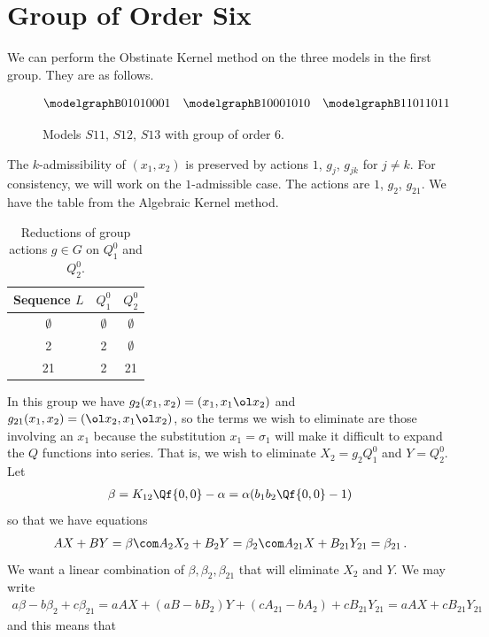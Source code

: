 \section{Group of Order Six}
We can perform the Obstinate Kernel method on the three models in the first group. They are as follows.
\begin{figure}[H]
    \centering
\[
	\modelgraphB 01010001\quad \modelgraphB 10001010 \quad \modelgraphB 11011011
\]
    \caption{Models $S11$, $S12$, $S13$ with group of order 6.}
\end{figure}
The $k$-admissibility of $(x_1,x_2)$ is preserved by actions $1$, $ g_j$, $ g_{jk}$ for $j \neq k$. For consistency, we will work on the $1$-admissible case. The actions are $1$, $ g_2$, $ g_{21}$. We have the table from the Algebraic Kernel method.
\begin{table}[H]
    \caption{Reductions of group actions $g \in G$ on $Q_1^0$ and $Q_2^0$.}
    \label{tbl:tableG6}
    \centering
    \begin{tabular}{ccc}
    \toprule
    Sequence $L$ & $Q_1^0$ & $Q_2^0$ \\  
    \midrule
      $\emptyset$ & $\emptyset$ & $\emptyset$  \\
      2 &  2& $\emptyset$ \\
      21 &  2& 21  \\
    \bottomrule
    \end{tabular}
\end{table}
In this group we have $g_2(x_1,x_2) = (x_1,x_1\ol x_2)$ and $g_{21}(x_1,x_2) = (\ol x_2,x_1\ol x_2)$, so the terms we wish to eliminate are those involving an $x_1$ because the substitution $x_1 = \sigma_1$ will make it difficult to expand the $Q$ functions into series. That is, we wish to eliminate $X_2 = g_2Q_1^0$ and $Y = Q_2^0$. Let
\begin{align}
	\beta = K_{12}\Qf{0,0} - \alpha = \alpha(b_1b_2\Qf{0,0}-1)
\end{align}
so that we have equations
\begin{align}
	AX+BY = \beta\com A_2X_2+B_2Y = \beta_2\com A_{21}X+B_{21}Y_{21} = \beta_{21}\,.		
\end{align}
We want a linear combination of $\beta, \beta_2, \beta_{21}$ that will eliminate $X_2$ and $Y$. We may write
\begin{align}
	a\beta - b\beta_2+c \beta_{21} = aAX + (aB-bB_2)Y + (cA_{21}-bA_2) + cB_{21}Y_{21} = aAX + cB_{21}Y_{21}
\end{align}
and this means that
